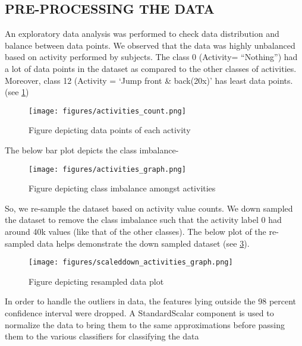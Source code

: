 \documentclass[acmtog]{acmart}
\begin{document}
\subsection{PRE-PROCESSING THE DATA}
An exploratory data analysis was performed to check data distribution and balance between data points. We observed that the data was highly unbalanced based on activity performed by subjects. The class 0 (Activity= “Nothing”) had a lot of data points in the dataset as compared to the other classes of activities. Moreover, class 12 (Activity = ‘Jump front \& back(20x)’ has least data points.(see \cref{fig:activities_count})
\begin{figure}[H]
    \centering
    \texttt{[image: figures/activities\_count.png]}
    \caption{Figure depicting data points of each activity}
    \label{fig:activities_count}
 \end{figure}
The below bar plot depicts the class imbalance-
\begin{figure}[H]
    \centering
    \texttt{[image: figures/activities\_graph.png]}
    \caption{Figure depicting class imbalance amongst activities}
    \label{fig:activities_graph}
 \end{figure}
So, we re-sample the dataset based on activity value counts. We down sampled the dataset to remove the class imbalance such that the activity label 0 had around 40k values (like that of the other classes). The below plot of the re-sampled data helps demonstrate the down sampled dataset (see \cref{fig:scaleddown_activities_graph}). 
\begin{figure}[H]
    \centering
    \texttt{[image: figures/scaleddown\_activities\_graph.png]}
    \caption{Figure depicting resampled data plot}
    \label{fig:scaleddown_activities_graph}
 \end{figure}
In order to handle the outliers in data, the features lying outside the 98 percent confidence interval were dropped. A StandardScalar component is used to normalize the data to bring them to the same approximations before passing them to the various classifiers for classifying the data
\end{document}
